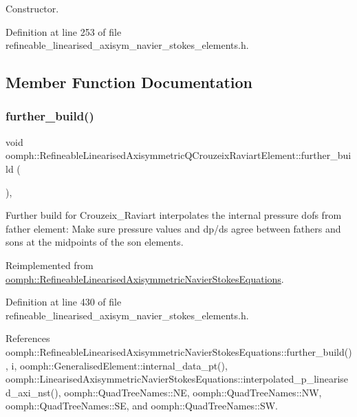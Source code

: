 Constructor. 



Definition at line 253 of file refineable\+\_\+linearised\+\_\+axisym\+\_\+navier\+\_\+stokes\+\_\+elements.\+h.



\subsection{Member Function Documentation}
\mbox{\label{classoomph_1_1RefineableLinearisedAxisymmetricQCrouzeixRaviartElement_a075e75e685c8d0cd2851b36f6bd865e0}} 
\subsubsection{\texorpdfstring{further\+\_\+build()}{further\_build()}}
{\footnotesize\ttfamily void oomph\+::\+Refineable\+Linearised\+Axisymmetric\+Q\+Crouzeix\+Raviart\+Element\+::further\+\_\+build (\begin{DoxyParamCaption}{ }\end{DoxyParamCaption})\hspace{0.3cm}{\ttfamily [inline]}, {\ttfamily [virtual]}}

Further build for Crouzeix\+\_\+\+Raviart interpolates the internal pressure dofs from father element\+: Make sure pressure values and dp/ds agree between fathers and sons at the midpoints of the son elements. 

Reimplemented from \hyperlink{classoomph_1_1RefineableLinearisedAxisymmetricNavierStokesEquations_aed7750eee08d103a6872b4ef882c24cd}{oomph\+::\+Refineable\+Linearised\+Axisymmetric\+Navier\+Stokes\+Equations}.



Definition at line 430 of file refineable\+\_\+linearised\+\_\+axisym\+\_\+navier\+\_\+stokes\+\_\+elements.\+h.



References oomph\+::\+Refineable\+Linearised\+Axisymmetric\+Navier\+Stokes\+Equations\+::further\+\_\+build(), i, oomph\+::\+Generalised\+Element\+::internal\+\_\+data\+\_\+pt(), oomph\+::\+Linearised\+Axisymmetric\+Navier\+Stokes\+Equations\+::interpolated\+\_\+p\+\_\+linearised\+\_\+axi\+\_\+nst(), oomph\+::\+Quad\+Tree\+Names\+::\+NE, oomph\+::\+Quad\+Tree\+Names\+::\+NW, oomph\+::\+Quad\+Tree\+Names\+::\+SE, and oomph\+::\+Quad\+Tree\+Names\+::\+SW.

